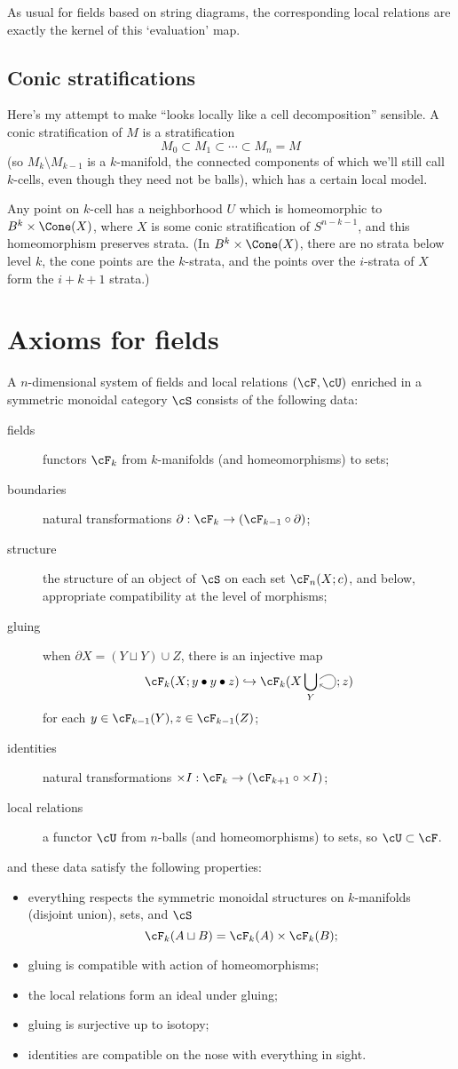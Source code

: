 \documentclass[11pt]{amsart}
\theoremstyle{plain}
\newcommand{\selfarrow}{\ensuremath{\smash{\tikz[baseline]{\clip (0,0.36) rectangle (0.48,-0.16); \draw[->] (0,0.175) .. controls (0.6,0.65) and (0.6,-0.45) .. (0,0.025);}}}}
\newcommand{\bdy}{\partial}
\newcommand{\into}{\hookrightarrow}
\begin{document}
As usual for fields based on string diagrams, the corresponding local relations are exactly the kernel of this `evaluation' map.

\subsection{Conic stratifications}
Here's my attempt to make ``looks locally like a cell decomposition'' sensible. A conic stratification of $M$ is a stratification $$M_0 \subset M_1 \subset \cdots \subset M_n = M$$
(so $M_k \setminus M_{k-1}$ is a $k$-manifold, the connected components of which we'll still call $k$-cells, even though they need not be balls), which has a certain local model.

Any point on $k$-cell has a neighborhood $U$ which is homeomorphic to $B^k \times \Cone(X)$, where $X$ is some conic stratification of $S^{n-k-1}$, and this homeomorphism preserves strata. (In $B^k \times \Cone(X)$, there are no strata below level $k$, the cone points are the $k$-strata, and the points over the $i$-strata of $X$ form the $i+k+1$ strata.)


\section{Axioms for fields}
A $n$-dimensional system of fields and local relations $(\cF, \cU)$ enriched in a symmetric monoidal category $\cS$ consists of the following data:
\begin{description}
\item[fields] functors $\cF_k$ from $k$-manifolds (and homeomorphisms) to sets;
\item[boundaries] natural transformations $\bdy : \cF_k \to (\cF_{k-1} \circ \bdy)$;
\item[structure] the structure of an object of $\cS$ on each set $\cF_n(X; c)$, and below, appropriate compatibility at the level of morphisms;
\item[gluing] when $\bdy X = (Y \sqcup Y) \cup Z$, there is an injective map $$\cF_k(X; y \bullet y \bullet z) \into \cF_k(X \bigcup_Y \selfarrow; z)$$ for each $y \in \cF_{k-1}(Y), z \in \cF_{k-1}(Z)$;
\item[identities] natural transformations $\times I: \cF_k \to (\cF_{k+1} \circ \times I)$;
\item[local relations] a functor $\cU$ from $n$-balls (and homeomorphisms) to sets, so $\cU \subset \cF$.
\end{description}
and these data satisfy the following properties:
\begin{itemize}
\item everything respects the symmetric monoidal structures on $k$-manifolds (disjoint union), sets, and $\cS$ $$\cF_k(A \sqcup B) = \cF_k(A) \times \cF_k(B);$$
\item gluing is compatible with action of homeomorphisms;
\item the local relations form an ideal under gluing;
\item gluing is surjective up to isotopy;
\item identities are compatible on the nose with everything in sight.
\end{itemize}
\end{document}
